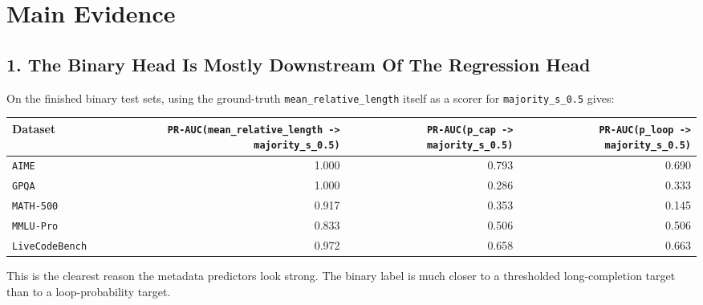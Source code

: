 \documentclass[11pt]{article}
\begin{document}
\section*{Main Evidence}
\subsection*{1. The Binary Head Is Mostly Downstream Of The Regression Head}
On the finished binary test sets, using the ground-truth \texttt{mean\_relative\_length} itself as a scorer for \texttt{majority\_s\_0.5} gives:

\begin{center}
\small
\begin{tabular}{@{}lrrr@{}}
\toprule
Dataset & \texttt{PR-AUC(mean\_relative\_length -> majority\_s\_0.5)} & \texttt{PR-AUC(p\_cap -> majority\_s\_0.5)} & \texttt{PR-AUC(p\_loop -> majority\_s\_0.5)} \\
\midrule
\texttt{AIME} & 1.000 & 0.793 & 0.690 \\
\texttt{GPQA} & 1.000 & 0.286 & 0.333 \\
\texttt{MATH-500} & 0.917 & 0.353 & 0.145 \\
\texttt{MMLU-Pro} & 0.833 & 0.506 & 0.506 \\
\texttt{LiveCodeBench} & 0.972 & 0.658 & 0.663 \\
\bottomrule
\end{tabular}
\end{center}

This is the clearest reason the metadata predictors look strong. The binary label is much closer to a thresholded long-completion target than to a loop-probability target.
\end{document}
